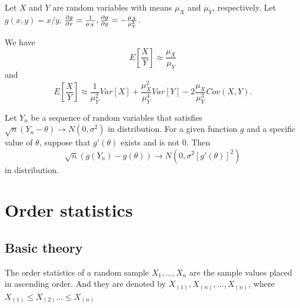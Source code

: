 \begin{refsection}
\begin{example}
Let $X$ and $Y$ are random variables with means $\mu_X$ and $\mu_Y$, respectively. Let $g(x,y) = x/y$. $\frac{\partial g}{\partial x} = \frac{1}{\mu_X}, \frac{\partial g}{\partial y} = -\frac{\mu_X}{\mu_Y^2}.$

We have
$$E[\frac{X}{Y}] \approx \frac{\mu_X}{\mu_Y}$$
and
$$E[\frac{X}{Y}] \approx \frac{1}{\mu_Y^2}Var[X] +\frac{\mu_X^2}{\mu_Y^4}Var[Y] - 2\frac{\mu_X}{\mu_Y^3}Cov(X,Y).$$

\end{example}

\begin{theorem}\cite[243]{casella2002statistical}
Let $Y_n$ be a sequence of random variables that satisfies $\sqrt{n}(Y_n - \theta) \to N(0,\sigma^2)$ in distribution. For a given function $g$ and a specific value of $\theta$, suppose that $g'(\theta)$ exists and is not 0. Then
$$\sqrt{n}(g(Y_n) - g(\theta)) \to N(0,\sigma^2[g'(\theta)]^2)$$
in distribution.
\end{theorem}


\section{Order statistics}
\subsection{Basic theory}
\begin{definition}
The order statistics of a random sample $X_1,...,X_n$ are the sample values placed in ascending order. And they are denoted by $X_{(1)},X_{(n)},...,X_{(n)}$, where $X_{(1)}\leq X_{(2)} ...\leq X_{(n)}$
\end{definition}


\end{refsection}
